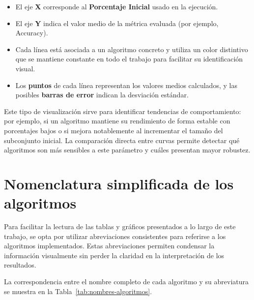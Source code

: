 \begin{itemize}
    \item El eje \textbf{X} corresponde al \textbf{Porcentaje Inicial} usado en la ejecución.
    \item El eje \textbf{Y} indica el valor medio de la métrica evaluada (por ejemplo, Accuracy).
    \item Cada línea está asociada a un algoritmo concreto y utiliza un color distintivo que se mantiene constante en todo el trabajo para facilitar su identificación visual.
    \item Los \textbf{puntos} de cada línea representan los valores medios calculados, y las posibles \textbf{barras de error} indican la desviación estándar.
\end{itemize}

Este tipo de visualización sirve para identificar tendencias de comportamiento: por ejemplo, si un algoritmo mantiene su rendimiento de forma estable con porcentajes bajos o si mejora notablemente al incrementar el tamaño del subconjunto inicial.
La comparación directa entre curvas permite detectar qué algoritmos son más sensibles a este parámetro y cuáles presentan mayor robustez.


\section{Nomenclatura simplificada de los algoritmos}\label{subsec:nomenclatura-algoritmos}
Para facilitar la lectura de las tablas y gráficos presentados a lo largo de este trabajo,
se opta por utilizar abreviaciones consistentes para referirse a los algoritmos implementados.
Estas abreviaciones permiten condensar la información visualmente sin perder la claridad en la interpretación de los resultados.

La correspondencia entre el nombre completo de cada algoritmo y su abreviatura se muestra en la Tabla~\ref{tab:nombres-algoritmos}.

